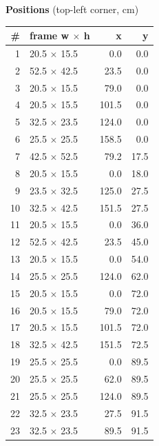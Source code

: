 \documentclass[a4paper,landscape,10pt]{article}
\begin{document}
\begin{minipage}[t]{0.25\textwidth}
\vspace{8pt}
{\bfseries Positions} (top-left corner, cm)\\[2pt]
\tiny
\begin{tabular}{@{}r l r r@{}}
\toprule
\# & frame w $\times$ h & x & y \\
\midrule
1 & 20.5 $\times$ 15.5 & 0.0 & 0.0 \\
2 & 52.5 $\times$ 42.5 & 23.5 & 0.0 \\
3 & 20.5 $\times$ 15.5 & 79.0 & 0.0 \\
4 & 20.5 $\times$ 15.5 & 101.5 & 0.0 \\
5 & 32.5 $\times$ 23.5 & 124.0 & 0.0 \\
6 & 25.5 $\times$ 25.5 & 158.5 & 0.0 \\
7 & 42.5 $\times$ 52.5 & 79.2 & 17.5 \\
8 & 20.5 $\times$ 15.5 & 0.0 & 18.0 \\
9 & 23.5 $\times$ 32.5 & 125.0 & 27.5 \\
10 & 32.5 $\times$ 42.5 & 151.5 & 27.5 \\
11 & 20.5 $\times$ 15.5 & 0.0 & 36.0 \\
12 & 52.5 $\times$ 42.5 & 23.5 & 45.0 \\
13 & 20.5 $\times$ 15.5 & 0.0 & 54.0 \\
14 & 25.5 $\times$ 25.5 & 124.0 & 62.0 \\
15 & 20.5 $\times$ 15.5 & 0.0 & 72.0 \\
16 & 20.5 $\times$ 15.5 & 79.0 & 72.0 \\
17 & 20.5 $\times$ 15.5 & 101.5 & 72.0 \\
18 & 32.5 $\times$ 42.5 & 151.5 & 72.5 \\
19 & 25.5 $\times$ 25.5 & 0.0 & 89.5 \\
20 & 25.5 $\times$ 25.5 & 62.0 & 89.5 \\
21 & 25.5 $\times$ 25.5 & 124.0 & 89.5 \\
22 & 32.5 $\times$ 23.5 & 27.5 & 91.5 \\
23 & 32.5 $\times$ 23.5 & 89.5 & 91.5 \\
\bottomrule
\end{tabular}
\end{minipage}
\clearpage
\end{document}
